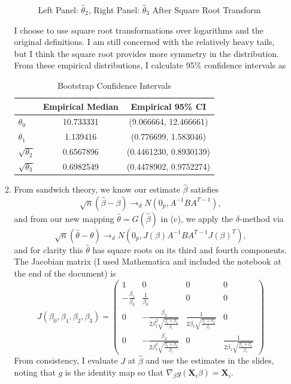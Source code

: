 \documentclass[11pt]{article}
\begin{document}
\begin{enumerate}
\begin{enumerate}
\begin{figure}[H]
				\caption{Left Panel: $\widehat{\theta}_2$, Right Panel: $\widehat{\theta}_3$ After Square Root Transform}
			\end{figure}
			I choose to use square root transformations over logarithms and the original definitions. I am still concerned with the relatively heavy tails, but I think the square root provides more symmetry in the distribution. From these empirical distributions, I calculate 95\% confidence intervals as
			\begin{table}[H]
			\centering			
			\begin{tabular}{l||c|c|}
			& Empirical Median & Empirical 95\% CI \\
			\hline
			\hline
			$\theta_0$ & 10.733331&(9.066664, 12.466661)  \\
			\hline
			$\theta_1$ & 1.139416& (0.776699, 1.583046) \\
			\hline
			$\sqrt{\theta_2}$ & 0.6567896& (0.4461230, 0.8930139)\\
			\hline
			$\sqrt{\theta_3}$ & 0.6982549& (0.4478902, 0.9752274) \\
			\end{tabular}
			\caption{Bootstrap Confidence Intervals}
			\end{table}
			\item From sandwich theory, we know our estimate $\widehat{\beta}$ satisfies
			\[
				\sqrt{n}(\widehat{\beta} - \beta)\to_d N(0_p, A^{-1}BA^{T-1}),
			\]
			and from our new mapping $\widehat{\theta} = G(\widehat{\beta})$ in (c), we apply the $\delta$-method via
			\[
				\sqrt{n}(\widehat{\theta} - \theta) \to_d N(0_p ,J(\beta)A^{-1}BA^{T-1}J(\beta)^T),
			\] 
			and for clarity this $\widehat{\theta}$ has square roots on its third and fourth components. The Jacobian matrix (I used Mathematica and included the notebook at the end of the document) is
			\[
				J(\beta_0,\beta_1,\beta_2,\beta_3) = \begin{pmatrix}
				1 & 0 & 0 & 0 \\
				-\frac{\beta_1}{\beta_0} & \frac{1}{\beta_0} & 0 & 0 \\
				0 & -\frac{\beta_2}{2\beta_1^2\sqrt{\frac{\beta_1+\beta_2}{\beta_1}}} & \frac{1}{2\beta_1\sqrt{\frac{\beta_1+\beta_2}{\beta_1}}} & 0 \\
				0 & -\frac{\beta_3}{2\beta_1^2\sqrt{\frac{\beta_1+\beta_3}{\beta_1}}} & 0 & \frac{1}{2\beta_1\sqrt{\frac{\beta_1+\beta_3}{\beta_1}}}
				\end{pmatrix}
			\]
			From consistency, I evaluate $J$ at $\widehat{\beta}$ and use the estimates in the slides, noting that $g$ is the identity map so that $\nabla_\beta g(\bm{X}_i\beta) = \bm{X}_i$.

\end{enumerate}
\end{enumerate}
\end{document}
